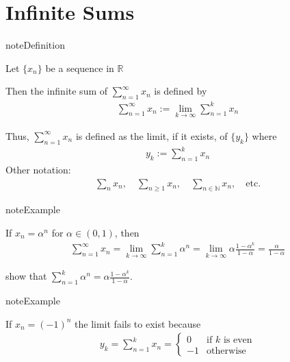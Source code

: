 \documentclass[letterpaper,10pt,english]{jupyterBook}
\begin{document}
\section{Infinite Sums}
\label{\detokenize{04.basic_analysis:infinite-sums}}
\begin{sphinxadmonition}{note}{Definition}

\sphinxAtStartPar
Let \(\{x_n\}\) be a sequence in \(\mathbb{R}\)

\sphinxAtStartPar
Then the infinite sum of \(\sum_{n=1}^{\infty} x_n\) is defined by
\begin{equation*}
\begin{split}
\sum_{n=1}^{\infty} x_n := \lim_{k\to \infty} \sum_{n=1}^k x_n  
\end{split}
\end{equation*}\end{sphinxadmonition}

\sphinxAtStartPar
Thus, \(\sum_{n=1}^{\infty} x_n\) is defined as the limit, if it exists,
of \(\{y_k\}\) where
\begin{equation*}
\begin{split}
y_k :=  \sum_{n=1}^k x_n  
\end{split}
\end{equation*}
\sphinxAtStartPar
Other notation:
\begin{equation*}
\begin{split}
\sum_n x_n, 
\quad \sum_{n \geq 1} x_n,
\quad \sum_{n \in \mathbb{N}} x_n,
\quad \text{etc.}
\end{split}
\end{equation*}
\begin{sphinxadmonition}{note}{Example}

\sphinxAtStartPar
If \(x_n = \alpha^n\) for \(\alpha \in (0, 1)\), then
\begin{equation*}
\begin{split}
\sum_{n=1}^{\infty} x_n 
= \lim_{k\to \infty} \sum_{n=1}^k \alpha^n
= \lim_{k\to \infty} \alpha \frac{1 - \alpha^k}{1 - \alpha}
=  \frac{\alpha}{1 - \alpha}
\end{split}
\end{equation*}\end{sphinxadmonition}

\sphinxAtStartPar
{} show that \(\sum_{n=1}^k \alpha^n
= \alpha \frac{1 - \alpha^k}{1 - \alpha}\).

\begin{sphinxadmonition}{note}{Example}

\sphinxAtStartPar
If \(x_n = (-1)^n\) the limit fails to exist because
\begin{equation*}
\begin{split}
y_k 
= \sum_{n=1}^k x_n
=
\begin{cases}
0 & \text{if $k$ is even}    
\\
-1 & \text{otherwise}
\end{cases}
\end{split}
\end{equation*}\end{sphinxadmonition}
\end{document}
